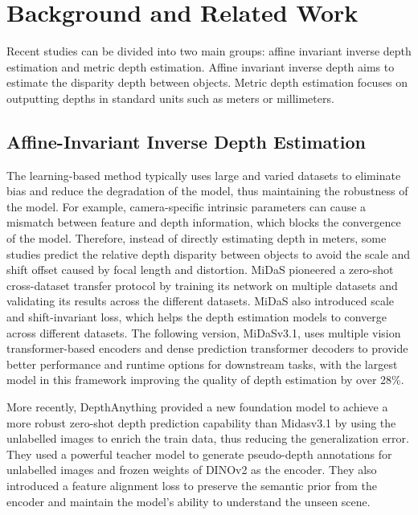 \section{Background and Related Work}
Recent studies can be divided into two main groups: affine invariant inverse depth estimation and metric depth estimation. Affine invariant inverse depth aims to estimate the disparity depth between objects. Metric depth estimation focuses on outputting depths in standard units such as meters or millimeters.
\subsection{Affine-Invariant Inverse Depth Estimation}
The learning-based method typically uses large and varied datasets to eliminate bias and reduce the degradation of the model, thus maintaining the robustness of the model. For example, camera-specific intrinsic parameters can cause a mismatch between feature and depth information, which blocks the convergence of the model. Therefore, instead of directly estimating depth in meters, some studies predict the relative depth disparity between objects to avoid the scale and shift offset caused by focal length and distortion. MiDaS\cite{MiDaS} pioneered a zero-shot cross-dataset transfer protocol by training its network on multiple datasets and validating its results across the different datasets. MiDaS also introduced scale and shift-invariant loss, which helps the depth estimation models to converge across different datasets. The following version, MiDaSv3.1\cite{MiDaSv3.1}, uses multiple vision transformer-based encoders \cite{beit,dosovitskiy2020vit,liu2021Swin,liu2021swinv2} and dense prediction transformer decoders \cite{dpt} to provide better performance and runtime options for downstream tasks, with the largest model in this framework improving the quality of depth estimation by over 28\%.

More recently, DepthAnything\cite{depth_anything_v1} provided a new foundation model to achieve a more robust zero-shot depth prediction capability than Midasv3.1 by using the unlabelled images to enrich the train data, thus reducing the generalization error. They used a powerful teacher model to generate pseudo-depth annotations for unlabelled images and frozen weights of DINOv2\cite{oquab2023dinov2} as the encoder. They also introduced a feature alignment loss to preserve the semantic prior from the encoder and maintain the model's ability to understand the unseen scene.


